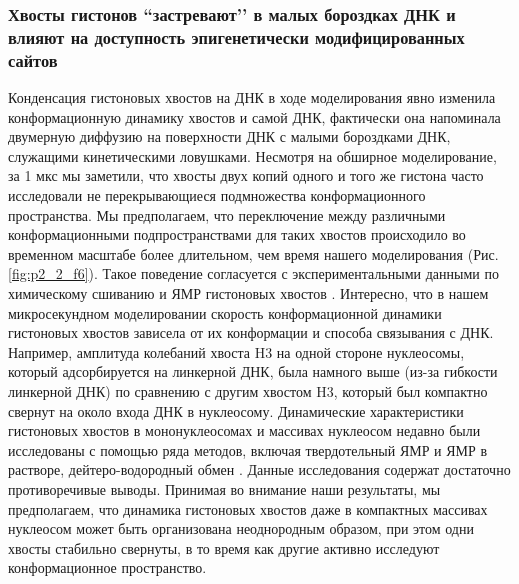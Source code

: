 \subsubsection{Хвосты гистонов ``застревают’’ в малых бороздках ДНК и влияют на доступность эпигенетически модифицированных сайтов}
    Конденсация гистоновых хвостов на ДНК в ходе моделирования явно изменила конформационную динамику хвостов и самой ДНК, фактически она напоминала двумерную диффузию на поверхности ДНК с малыми бороздками ДНК, служащими кинетическими ловушками. Несмотря на обширное моделирование, за 1 мкс мы заметили, что хвосты двух копий одного и того же гистона часто исследовали не перекрывающиеся подмножества конформационного пространства. Мы предполагаем, что переключение между различными конформационными подпространствами для таких хвостов происходило во временном масштабе более длительном, чем время нашего моделирования (Рис. \ref{fig:p2_2_f6}). Такое поведение согласуется с экспериментальными данными по химическому  сшиванию и ЯМР гистоновых хвостов \cite{lee_n-terminal_1997,zhou_histone_2012}. Интересно, что в нашем микросекундном моделировании скорость конформационной динамики гистоновых хвостов зависела от их конформации и способа связывания с ДНК. Например, амплитуда колебаний хвоста H3 на одной стороне нуклеосомы, который адсорбируется на линкерной ДНК, была намного выше (из-за гибкости линкерной ДНК) по сравнению с другим хвостом H3, который был компактно свернут на около входа ДНК в нуклеосому. Динамические характеристики гистоновых хвостов в мононуклеосомах и массивах нуклеосом недавно были исследованы с помощью ряда методов, включая твердотельный ЯМР и ЯМР в растворе, дейтеро-водородный обмен \cite{kato_characterization_2009,zhou_histone_2012,gao_histone_2013}. Данные исследования содержат достаточно противоречивые выводы. Принимая во внимание наши результаты, мы предполагаем, что динамика гистоновых хвостов даже в компактных массивах нуклеосом может быть организована неоднородным образом, при этом одни хвосты стабильно свернуты, в то время как другие активно исследуют конформационное пространство.

